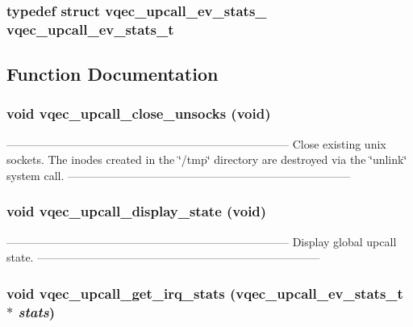 \subsubsection{\setlength{\rightskip}{0pt plus 5cm}typedef struct \bf{vqec\_\-upcall\_\-ev\_\-stats\_\-}  \bf{vqec\_\-upcall\_\-ev\_\-stats\_\-t}}\label{vqec__upcall__event_8h_dc88a27ec661230eb95aba5bc99e53d4}




\subsection{Function Documentation}
\subsubsection{\setlength{\rightskip}{0pt plus 5cm}void vqec\_\-upcall\_\-close\_\-unsocks (void)}\label{vqec__upcall__event_8h_020466839798c4aa443c388dfe065188}


--------------------------------------------------------------------------- Close existing unix sockets. The inodes created in the \char`\"{}/tmp\char`\"{} directory are destroyed via the \char`\"{}unlink\char`\"{} system call. --------------------------------------------------------------------------- 
\subsubsection{\setlength{\rightskip}{0pt plus 5cm}void vqec\_\-upcall\_\-display\_\-state (void)}\label{vqec__upcall__event_8h_d5111e800a4f6f9011aacefd7e9166d7}


--------------------------------------------------------------------------- Display global upcall state. --------------------------------------------------------------------------- 
\subsubsection{\setlength{\rightskip}{0pt plus 5cm}void vqec\_\-upcall\_\-get\_\-irq\_\-stats (\bf{vqec\_\-upcall\_\-ev\_\-stats\_\-t} $\ast$ {\em stats})}\label{vqec__upcall__event_8h_2f4a8fcca9020fae5255a967c2f54f14}


